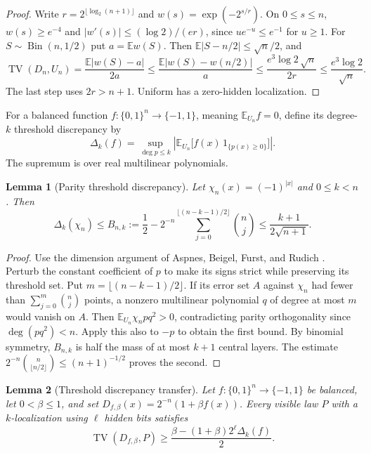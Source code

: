 \documentclass{article}
\newcommand{\E}{\mathbb{E}}
\newcommand{\bits}{\{0,1\}}
\newtheorem{lemma}{Lemma}
\begin{document}
\begin{proof}
Write $r=2^{\lfloor\log_2(n+1)\rfloor}$ and $w(s)=\exp(-2^{s/r})$.
On $0\le s\le n$, $w(s)\ge e^{-4}$ and
$|w'(s)|\le(\log 2)/(er)$, since $u e^{-u}\le e^{-1}$ for $u\ge1$.
For $S\sim\operatorname{Bin}(n,1/2)$ put $a=\E w(S)$.
Then $\E|S-n/2|\le\sqrt n/2$, and
\[
 \operatorname{TV}(D_n,U_n)
 =\frac{\E|w(S)-a|}{2a}
 \le\frac{\E|w(S)-w(n/2)|}{a}
 \le\frac{e^3\log 2\,\sqrt n}{2r}
 \le\frac{e^3\log 2}{\sqrt n}.
\]
The last step uses $2r>n+1$.  Uniform has a zero-hidden localization.
\end{proof}

For a balanced function $f:\bits^n\to\{-1,1\}$, meaning $\E_{U_n}f=0$,
define its degree-$k$ threshold discrepancy by
\[
 \Delta_k(f)=
 \sup_{\deg p\le k}
 \left|\E_{U_n}\bigl[f(x)\,1_{\{p(x)\ge0\}}\bigr]\right|.
\]
The supremum is over real multilinear polynomials.

\begin{lemma}[Parity threshold discrepancy]
\label{lem:parity-threshold-discrepancy}
Let $\chi_n(x)=(-1)^{|x|}$ and $0\le k<n$.  Then
\[
 \Delta_k(\chi_n)
 \le B_{n,k}:=
 \frac12-2^{-n}\sum_{j=0}^{\lfloor(n-k-1)/2\rfloor}\binom nj
 \le\frac{k+1}{2\sqrt{n+1}}.
\]
\end{lemma}

\begin{proof}
Use the dimension argument of Aspnes, Beigel, Furst, and Rudich
\cite[Theorem~2.2]{abfr94}.
Perturb the constant coefficient of $p$ to make its signs strict while
preserving its threshold set.
Put $m=\lfloor(n-k-1)/2\rfloor$.
If its error set $A$ against $\chi_n$ had fewer than
$\sum_{j=0}^m\binom nj$ points, a nonzero multilinear polynomial $q$ of
degree at most $m$ would vanish on $A$.
Then $\E_{U_n}\chi_n p q^2>0$, contradicting parity orthogonality since
$\deg(pq^2)<n$.  Apply this also to $-p$ to obtain the first bound.
By binomial symmetry, $B_{n,k}$ is half the mass of at most $k+1$ central
layers.  The estimate
$2^{-n}\binom n{\lfloor n/2\rfloor}\le(n+1)^{-1/2}$ proves the second.
\end{proof}

\begin{lemma}[Threshold discrepancy transfer]
\label{lem:threshold-discrepancy-transfer}
Let $f:\bits^n\to\{-1,1\}$ be balanced, let $0<\beta\le1$, and set
$D_{f,\beta}(x)=2^{-n}(1+\beta f(x))$.
Every visible law $P$ with a $k$-localization using $\ell$ hidden bits satisfies
\[
 \operatorname{TV}(D_{f,\beta},P)
 \ge \frac{\beta-(1+\beta)2^\ell\Delta_k(f)}{2}.
\]
\end{lemma}
\end{document}
